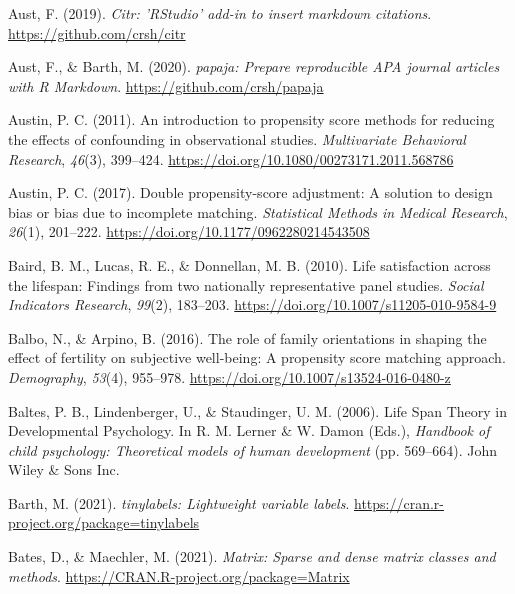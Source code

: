 \documentclass[
  english,
  man,floatsintext]{apa7}
\begin{document}
\leavevmode\hypertarget{ref-R-citr}{}%
Aust, F. (2019). \emph{Citr: 'RStudio' add-in to insert markdown citations}. \url{https://github.com/crsh/citr}

\leavevmode\hypertarget{ref-R-papaja}{}%
Aust, F., \& Barth, M. (2020). \emph{papaja: Prepare reproducible APA journal articles with R Markdown}. \url{https://github.com/crsh/papaja}

\leavevmode\hypertarget{ref-austinIntroductionPropensityScore2011}{}%
Austin, P. C. (2011). An introduction to propensity score methods for reducing the effects of confounding in observational studies. \emph{Multivariate Behavioral Research}, \emph{46}(3), 399--424. \url{https://doi.org/10.1080/00273171.2011.568786}

\leavevmode\hypertarget{ref-austinDoublePropensityscoreAdjustment2017}{}%
Austin, P. C. (2017). Double propensity-score adjustment: A solution to design bias or bias due to incomplete matching. \emph{Statistical Methods in Medical Research}, \emph{26}(1), 201--222. \url{https://doi.org/10.1177/0962280214543508}

\leavevmode\hypertarget{ref-bairdLifeSatisfactionLifespan2010}{}%
Baird, B. M., Lucas, R. E., \& Donnellan, M. B. (2010). Life satisfaction across the lifespan: Findings from two nationally representative panel studies. \emph{Social Indicators Research}, \emph{99}(2), 183--203. \url{https://doi.org/10.1007/s11205-010-9584-9}

\leavevmode\hypertarget{ref-balboRoleFamilyOrientations2016}{}%
Balbo, N., \& Arpino, B. (2016). The role of family orientations in shaping the effect of fertility on subjective well-being: A propensity score matching approach. \emph{Demography}, \emph{53}(4), 955--978. \url{https://doi.org/10.1007/s13524-016-0480-z}

\leavevmode\hypertarget{ref-baltesLifeSpanTheory2006}{}%
Baltes, P. B., Lindenberger, U., \& Staudinger, U. M. (2006). Life Span Theory in Developmental Psychology. In R. M. Lerner \& W. Damon (Eds.), \emph{Handbook of child psychology: Theoretical models of human development} (pp. 569--664). John Wiley \& Sons Inc.

\leavevmode\hypertarget{ref-R-tinylabels}{}%
Barth, M. (2021). \emph{tinylabels: Lightweight variable labels}. \url{https://cran.r-project.org/package=tinylabels}

\leavevmode\hypertarget{ref-R-Matrix}{}%
Bates, D., \& Maechler, M. (2021). \emph{Matrix: Sparse and dense matrix classes and methods}. \url{https://CRAN.R-project.org/package=Matrix}
\end{document}
